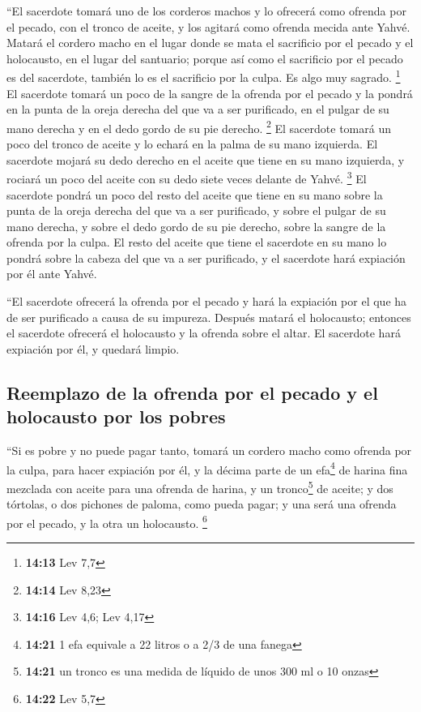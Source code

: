 \begin{paracol}{2}
 ``El sacerdote tomará uno de los corderos machos y lo
ofrecerá como ofrenda por el pecado, con el tronco de aceite, y los
agitará como ofrenda mecida ante Yahvé.  Matará el
cordero macho en el lugar donde se mata el sacrificio por el pecado y el
holocausto, en el lugar del santuario; porque así como el sacrificio por
el pecado es del sacerdote, también lo es el sacrificio por la culpa. Es
algo muy sagrado. \footnote{\textbf{14:13} Lev 7,7}  El
sacerdote tomará un poco de la sangre de la ofrenda por el pecado y la
pondrá en la punta de la oreja derecha del que va a ser purificado, en
el pulgar de su mano derecha y en el dedo gordo de su pie derecho.
\footnote{\textbf{14:14} Lev 8,23}  El sacerdote tomará
un poco del tronco de aceite y lo echará en la palma de su mano
izquierda.  El sacerdote mojará su dedo derecho en el
aceite que tiene en su mano izquierda, y rociará un poco del aceite con
su dedo siete veces delante de Yahvé. \footnote{\textbf{14:16} Lev 4,6;
  Lev 4,17}  El sacerdote pondrá un poco del resto del
aceite que tiene en su mano sobre la punta de la oreja derecha del que
va a ser purificado, y sobre el pulgar de su mano derecha, y sobre el
dedo gordo de su pie derecho, sobre la sangre de la ofrenda por la
culpa.  El resto del aceite que tiene el sacerdote en su
mano lo pondrá sobre la cabeza del que va a ser purificado, y el
sacerdote hará expiación por él ante Yahvé.

 ``El sacerdote ofrecerá la ofrenda por el pecado y hará
la expiación por el que ha de ser purificado a causa de su impureza.
Después matará el holocausto;  entonces el sacerdote
ofrecerá el holocausto y la ofrenda sobre el altar. El sacerdote hará
expiación por él, y quedará limpio.

\hypertarget{reemplazo-de-la-ofrenda-por-el-pecado-y-el-holocausto-por-los-pobres}{%
\subsection{Reemplazo de la ofrenda por el pecado y el holocausto por
los
pobres}\label{reemplazo-de-la-ofrenda-por-el-pecado-y-el-holocausto-por-los-pobres}}

 ``Si es pobre y no puede pagar tanto, tomará un cordero
macho como ofrenda por la culpa, para hacer expiación por él, y la
décima parte de un efa\footnote{\textbf{14:21} 1 efa equivale a 22
  litros o a 2/3 de una fanega} de harina fina mezclada con aceite para
una ofrenda de harina, y un tronco\footnote{\textbf{14:21} un tronco es
  una medida de líquido de unos 300 ml o 10 onzas} de aceite;
 y dos tórtolas, o dos pichones de paloma, como pueda
pagar; y una será una ofrenda por el pecado, y la otra un holocausto.
\footnote{\textbf{14:22} Lev 5,7}


\end{paracol}
